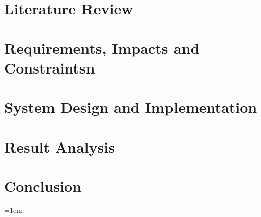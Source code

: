 \documentclass[Times,12pt,oneside,openany,print,index]{report}
\begin{document}
\chapter{Literature Review}


\chapter{Requirements, Impacts and Constraintsn}


\chapter{System Design and Implementation}


\chapter{Result Analysis}


\chapter{Conclusion}    

\begingroup
\emergencystretch=1em
\printbibliography %
\endgroup
{}

\newpage
{}
{}


\newpage
{}
{}

\end{document}
